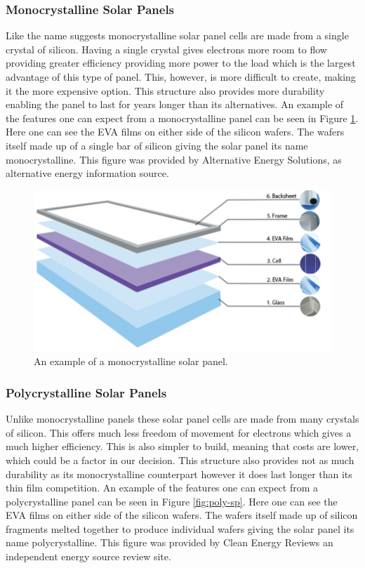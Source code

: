 \subsubsection{Monocrystalline Solar Panels}

Like the name suggests monocrystalline solar panel cells are made from a single crystal of silicon. Having a single crystal gives electrons more room to flow providing greater efficiency providing more power to the load which is the largest advantage of this type of panel. This, however, is more difficult to create, making it the more expensive option. This structure also provides more durability enabling the panel to last for years longer than its alternatives. An example of the features one can expect from a monocrystalline panel can be seen in Figure \ref{fig:mono-sp}. Here one can see the EVA films on either side of the silicon wafers. The wafers itself made up of a single bar of silicon giving the solar panel its name monocrystalline. This figure was provided by Alternative Energy Solutions, as alternative energy information source.

\begin{figure}
    \centering
    \includegraphics[scale=0.5]{figures/monocrystaline.png}
    \caption{An example of a monocrystalline solar panel.}
    \label{fig:mono-sp} 
\end{figure}

\subsubsection{Polycrystalline Solar Panels}
Unlike monocrystalline panels these solar panel cells are made from many crystals of silicon. This offers much less freedom of movement for electrons which gives a much higher efficiency. This is also simpler to build, meaning that costs are lower, which could be a factor in our decision. This structure also provides not as much durability as its monocrystalline counterpart however it does last longer than its thin film competition. An example of the features one can expect from a polycrystalline panel can be seen in Figure \ref{fig:poly-sp}. Here one can see the EVA films on either side of the silicon wafers. The wafers itself made up of silicon fragments melted together to produce individual wafers giving the solar panel its name polycrystalline. This figure was provided by Clean Energy Reviews an independent energy source review site.

